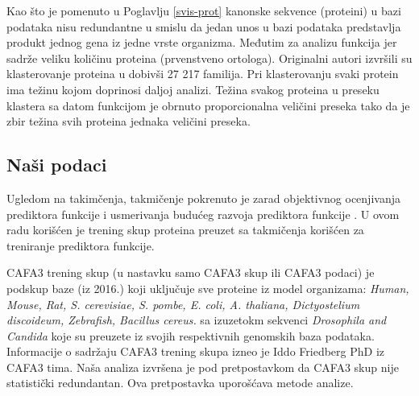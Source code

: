 Kao što je pomenuto u Poglavlju \ref{svis-prot} kanonske sekvence (proteini) u \swissprot
bazi podataka nisu redundantne u smislu da jedan unos u bazi podataka predstavlja produkt
jednog gena iz jedne vrste organizma. Međutim za analizu funkcija
\swissprot {} \parencite{proveriti} jer
sadrže veliku količinu  proteina (prvenstveno ortologa).
Originalni autori izvršili su klasterovanje \swissprot
proteina u  dobivši 27 217 familija. Pri klasterovanju svaki protein
ima težinu kojom doprinosi daljoj analizi. Težina svakog proteina u preseku
klastera sa datom funkcijom je obrnuto proporcionalna veličini preseka
tako da je zbir težina svih proteina jednaka veličini preseka.

%

\subsection{Naši podaci}

Ugledom na  takimčenja,   takmičenje pokrenuto je zarad objektivnog ocenjivanja
prediktora funkcije i usmerivanja budućeg razvoja prediktora funkcije
\parencite{CAFA}.  U ovom radu korišćen je trening skup proteina preuzet sa
 takmičenja korišćen za treniranje prediktora funkcije.

CAFA3 trening skup (u nastavku samo CAFA3 skup ili CAFA3 podaci) je podskup \swissprot baze (iz 2016.) koji
uključuje sve proteine iz model organizama: \textit{Human, Mouse, Rat, S.
cerevisiae, S. pombe, E. coli, A. thaliana, Dictyostelium discoideum,
Zebrafish, Bacillus cereus. } sa izuzetokm sekvenci \textit{Drosophila and
Candida} koje su preuzete iz svojih respektivnih genomskih baza podataka.
Informacije o sadržaju CAFA3 trening skupa izneo je Iddo Friedberg PhD iz CAFA3 tima.
Naša analiza izvršena je pod pretpostavkom da  CAFA3 skup nije statistički redundantan.
Ova pretpostavka uporošćava metode analize.

